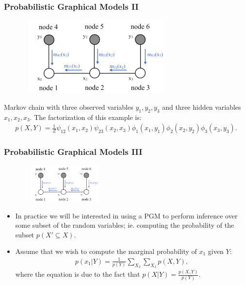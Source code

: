 \documentclass{beamer}
\begin{document}
\begin{frame}
\frametitle{Probabilistic Graphical Models II}
\begin{figure}
	\begin{center}
		\includegraphics[width=8cm, height=4cm]{bp}
	\end{center}
\end{figure}
Markov chain with three observed variables $y_1, y_2, y_3$ and three hidden variables $x_1, x_2, x_3$.  The factorization of this example is: 
\begin{gather*}
p(X, Y) = \frac{1}{Z} \psi_{12}(x_1, x_2) \psi_{23}(x_2, x_3) \phi_1(x_1, y_1) \phi_2(x_2, y_2) \phi_3(x_3, y_3).
\end{gather*}
\end{frame}

\begin{frame}
\frametitle{Probabilistic Graphical Models III}
\begin{figure}
	\begin{center}
		\includegraphics[width=4.5cm, height=2cm]{bp}
	\end{center}
\end{figure}
\begin{itemize}
	\item In practice we will be interested in using a PGM to perform inference over some subset of the random variables; ie. computing the probability of the subset $p(X' \subseteq X)$. 
	\item Assume that we wish to compute the marginal probability of $x_1$ given $Y$: 
	\begin{gather*}
	p(x_1 | Y) = \frac{1}{p(Y)} \sum_{X_2} \sum_{X_3} p(X, Y),
	\end{gather*}
	where the equation is due to the fact that $p(X|Y) = \frac{p(X,Y)}{p(Y)}$.
\end{itemize}
\end{frame}
\end{document}
